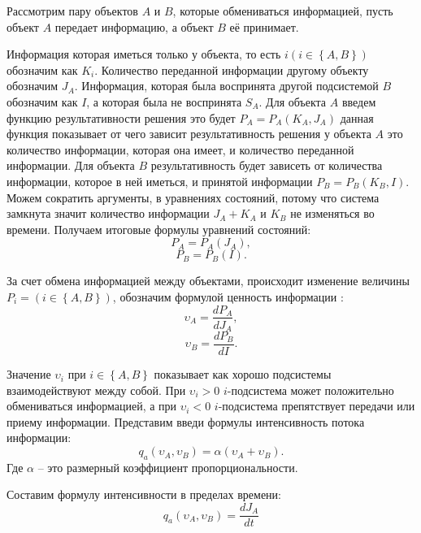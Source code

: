 Рассмотрим пару объектов $A$ и $B$, которые обмениваться информацией, пусть объект $A$ передает информацию, а объект $B$ её принимает.

Информация которая иметься только у объекта, то есть  $i \left( i \in \left\{A,B \right\} \right)$ обозначим как $K_i$. Количество переданной информации другому объекту обозначим $J_A$. Информация, которая была воспринята другой подсистемой $B$ обозначим как $I$, а которая была не воспринята $S_A$. Для объекта $A$ введем функцию результативности решения это будет $P_A=P_A(K_A,J_A)$ данная функция показывает от чего зависит результативность решения у объекта $A$ 	это количество информации, которая она имеет, и количество переданной информации. Для объекта $B$ результативность будет зависеть от количества информации, которое в ней иметься, и принятой информации $P_B=P_B(K_B,I)$. 
Можем сократить аргументы, в уравнениях состояний, потому что система замкнута значит количество информации $J_A+K_A$ и $K_B$ не изменяться во времени. Получаем итоговые формулы уравнений состояний:
\begin{equation}\label{eq:sost1}
P_A=P_A(J_A),
\end{equation}
\begin{equation}\label{eq:sost2}
P_B=P_B(I). 
\end{equation}

За счет обмена информацией между объектами, происходит изменение величины $P_i = \left( i \in \left\{A,B \right\} \right)$, обозначим формулой ценность информации :
\begin{equation}\label{eq:cenoostinfo1}
\upsilon_A = \frac{dP_A}{dJ_A},
\end{equation}
\begin{equation}\label{eq:cenoostinfo2}
\upsilon_B = \frac{dP_B	}{dI}.
\end{equation}

Значение $\upsilon_i$ при $i \in \left\{A,B \right\}$ показывает как хорошо подсистемы взаимодействуют между собой. При $\upsilon_i > 0$ $i$-подсистема может положительно обмениваться информацией, а при $\upsilon_i < 0$ $i$-подсистема препятствует передачи или приему информации. Представим введи формулы интенсивность потока информации:
\begin{equation}\label{eq:intensive}
q_a(\upsilon_A,\upsilon_B) = \alpha (\upsilon_A + \upsilon_B).
\end{equation}
Где $\alpha$ -- это размерный коэффициент пропорциональности.

Составим формулу интенсивности в пределах времени:
\begin{equation}\label{eq:intensiveA}
q_a(\upsilon_A,\upsilon_B) = \frac{dJ_A}{dt}
\end{equation}

